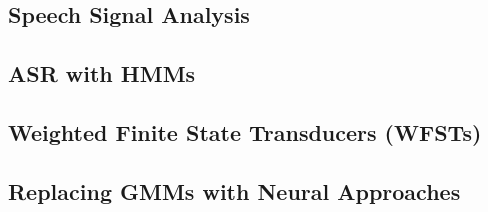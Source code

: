 \documentclass[9pt]{extarticle}
\begin{document}
  \begin{multicols}{2}
  \subsection*{Speech Signal Analysis}
  
  \subsection*{ASR with HMMs}
  
  \subsection*{Weighted Finite State Transducers (WFSTs)}
  
  \subsection*{Replacing GMMs with Neural Approaches}
  
  \end{multicols}
\end{document}
